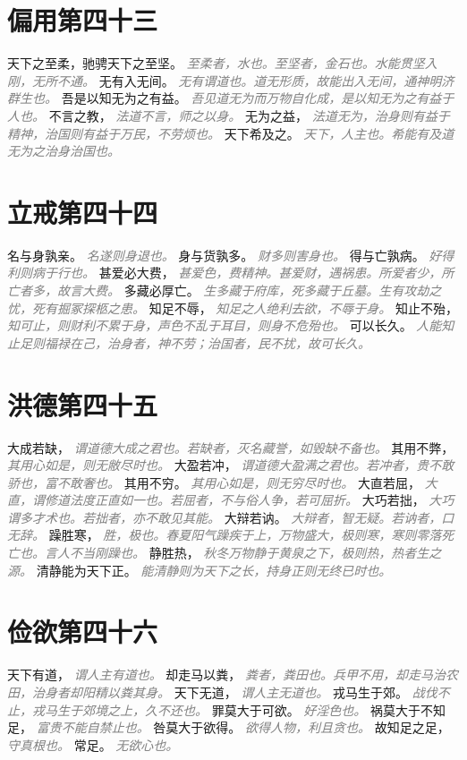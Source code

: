 \documentclass[a4paper,zihao=-4,oneside,landscape,UTF8]{ctexart}
\newcommand{\zhushi}[1]{\scriptsize{\textit{\textcolor{gray}{#1}}}\normalsize}
\begin{document}
\section{偏用第四十三}

天下之至柔，驰骋天下之至坚。
\zhushi{至柔者，水也。至坚者，金石也。水能贯坚入刚，无所不通。}
无有入无间。
\zhushi{无有谓道也。道无形质，故能出入无间，通神明济群生也。}
吾是以知无为之有益。
\zhushi{吾见道无为而万物自化成，是以知无为之有益于人也。}
不言之教，
\zhushi{法道不言，师之以身。}
无为之益，
\zhushi{法道无为，治身则有益于精神，治国则有益于万民，不劳烦也。}
天下希及之。
\zhushi{天下，人主也。希能有及道无为之治身治国也。}


\section{立戒第四十四}

名与身孰亲。
\zhushi{名遂则身退也。}
身与货孰多。
\zhushi{财多则害身也。}
得与亡孰病。
\zhushi{好得利则病于行也。}
甚爱必大费，
\zhushi{甚爱色，费精神。甚爱财，遇祸患。所爱者少，所亡者多，故言大费。}
多藏必厚亡。
\zhushi{生多藏于府库，死多藏于丘墓。生有攻劫之忧，死有掘冢探柩之患。}
知足不辱，
\zhushi{知足之人绝利去欲，不辱于身。}
知止不殆，
\zhushi{知可止，则财利不累于身，声色不乱于耳目，则身不危殆也。}
可以长久。
\zhushi{人能知止足则福禄在己，治身者，神不劳；治国者，民不扰，故可长久。}


\section{洪德第四十五}

大成若缺，
\zhushi{谓道德大成之君也。若缺者，灭名藏誉，如毁缺不备也。}
其用不弊，
\zhushi{其用心如是，则无敝尽时也。}
大盈若冲，
\zhushi{谓道德大盈满之君也。若冲者，贵不敢骄也，富不敢奢也。}
其用不穷。
\zhushi{其用心如是，则无穷尽时也。}
大直若屈，
\zhushi{大直，谓修道法度正直如一也。若屈者，不与俗人争，若可屈折。}
大巧若拙，
\zhushi{大巧谓多才术也。若拙者，亦不敢见其能。}
大辩若讷。
\zhushi{大辩者，智无疑。若讷者，口无辞。}
躁胜寒，
\zhushi{胜，极也。春夏阳气躁疾于上，万物盛大，极则寒，寒则零落死亡也。言人不当刚躁也。}
静胜热，
\zhushi{秋冬万物静于黄泉之下，极则热，热者生之源。}
清静能为天下正。
\zhushi{能清静则为天下之长，持身正则无终已时也。}


\section{俭欲第四十六}

天下有道，
\zhushi{谓人主有道也。}
却走马以粪，
\zhushi{粪者，粪田也。兵甲不用，却走马治农田，治身者却阳精以粪其身。}
天下无道，
\zhushi{谓人主无道也。}
戎马生于郊。
\zhushi{战伐不止，戎马生于郊境之上，久不还也。}
罪莫大于可欲。
\zhushi{好淫色也。}
祸莫大于不知足，
\zhushi{富贵不能自禁止也。}
咎莫大于欲得。
\zhushi{欲得人物，利且贪也。}
故知足之足，
\zhushi{守真根也。}
常足。
\zhushi{无欲心也。}
\end{document}
